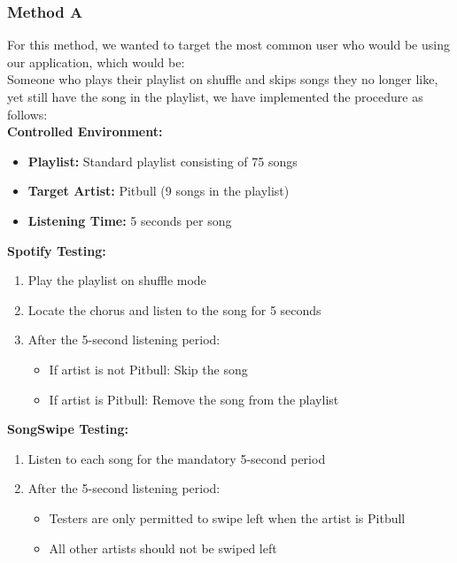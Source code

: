 \documentclass{article}
\begin{document}
\subsubsection*{Method A}
For this method, we wanted to target the most common user who would be using our application, which would be:\\
    
Someone who plays their playlist on shuffle and skips songs they no longer like, yet still have the song in the playlist, we have implemented the procedure as follows: \\

   \textbf{Controlled Environment:}
    
    \begin{itemize}
    \item \textbf{Playlist:} Standard playlist consisting of 75 songs
    \item \textbf{Target Artist:} Pitbull (9 songs in the playlist)
    \item \textbf{Listening Time:} 5 seconds per song
    \end{itemize}
    
    \textbf{Spotify Testing:} 
    
    \begin{enumerate}
        \item Play the playlist on shuffle mode
        \item Locate the chorus and listen to the song for 5 seconds
        \item After the 5-second listening period:
            \begin{itemize}
                \item If artist is not Pitbull: Skip the song
                \item If artist is Pitbull: Remove the song from the playlist
            \end{itemize}
    \end{enumerate}

    \textbf{SongSwipe Testing:}
    
    \begin{enumerate}
        \item Listen to each song for the mandatory 5-second period
        \item After the 5-second listening period:
            \begin{itemize}
                \item Testers are only permitted to swipe left when the artist is Pitbull
                \item All other artists should not be swiped left
            \end{itemize}
    \end{enumerate}
\end{document}

